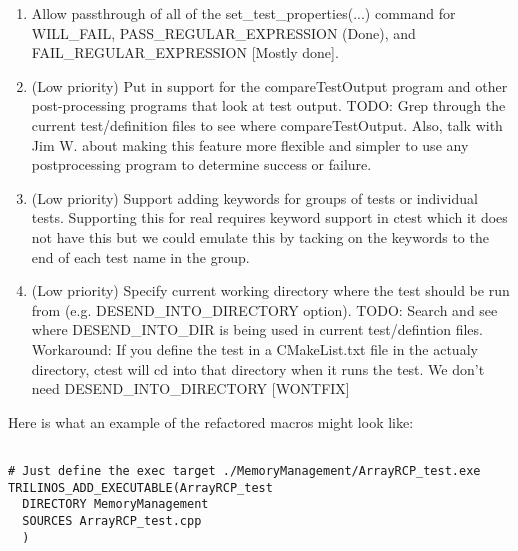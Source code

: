 \documentclass[pdf,ps2pdf,11pt]{SANDreport}
\begin{document}
\begin{enumerate}
\begin{enumerate}
\begin{itemize}
    {}\item Selection/defintion of test based on the number of allowed
    MPI processors for the test and the global machine max number of
    processes (Hint: See what the perl-based 'runtests' script does).
    I.e. compare the input NUM\_MPI\_PROCS to the global cache varible
    MPIEXEC\_MAX\_NUMPROCS and see if the test passes.  TODO: Search
    through the test/definition files to see how COMM = MPI(???) is
    actually being used and talk with Jim W.\ about this.
	
    \end{itemize}

   [Done]

  {}\item Allow passthrough of all of the set\_test\_properties(...) 
  command for WILL\_FAIL, PASS\_REGULAR\_EXPRESSION (Done), and
  FAIL\_REGULAR\_EXPRESSION [Mostly done].

  {}\item (Low priority) Put in support for the compareTestOutput
  program and other post-processing programs that look at test output.
  TODO: Grep through the current test/definition files to see where
  compareTestOutput.  Also, talk with Jim W. about making this feature
  more flexible and simpler to use any postprocessing program to
  determine success or failure.

  {}\item (Low priority) Support adding keywords for groups of tests
  or individual tests.  Supporting this for real requires keyword
  support in ctest which it does not have this but we could emulate
  this by tacking on the keywords to the end of each test name in the
  group.

  {}\item (Low priority) Specify current working directory where the
  test should be run from (e.g. DESEND\_INTO\_DIRECTORY option).
  TODO: Search and see where DESEND\_INTO\_DIR is being used in
  current test/defintion files.  Workaround: If you define the test in
  a CMakeList.txt file in the actualy directory, ctest will cd into
  that directory when it runs the test.  We don't need
  DESEND\_INTO\_DIRECTORY [WONTFIX]

  \end{enumerate}

Here is what an example of the refactored macros might look like:

\begin{verbatim}

# Just define the exec target ./MemoryManagement/ArrayRCP_test.exe
TRILINOS_ADD_EXECUTABLE(ArrayRCP_test
  DIRECTORY MemoryManagement
  SOURCES ArrayRCP_test.cpp
  )


\end{verbatim}
\end{enumerate}
\end{document}
